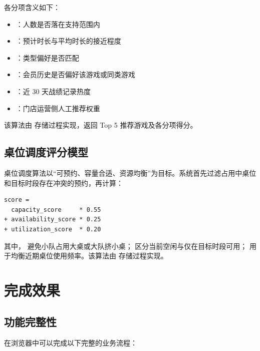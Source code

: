 各分项含义如下：

\begin{itemize}
  \item {}：人数是否落在支持范围内
  \item {}：预计时长与平均时长的接近程度
  \item {}：类型偏好是否匹配
  \item {}：会员历史是否偏好该游戏或同类游戏
  \item {}：近 30 天战绩记录热度
  \item {}：门店运营侧人工推荐权重
\end{itemize}

该算法由  存储过程实现，返回 Top 5 推荐游戏及各分项得分。

\subsection{桌位调度评分模型}

桌位调度算法以“可预约、容量合适、资源均衡”为目标。系统首先过滤占用中桌位和目标时段存在冲突的预约，再计算：

\begin{lstlisting}[caption=桌位推荐评分公式]
score =
  capacity_score     * 0.55
+ availability_score * 0.25
+ utilization_score  * 0.20
\end{lstlisting}

其中， 避免小队占用大桌或大队挤小桌； 区分当前空闲与仅在目标时段可用； 用于均衡近期桌位使用频率。该算法由  存储过程实现。

\section{完成效果}

\subsection{功能完整性}

在浏览器中可以完成以下完整的业务流程：

